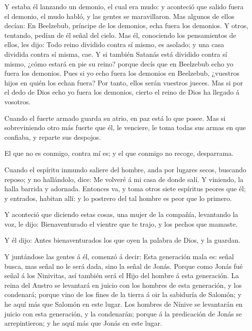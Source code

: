  Y estaba él lanzando un demonio, el cual era mudo: y
aconteció que salido fuera el demonio, el mudo habló, y las gentes se
maravillaron.  Mas algunos de ellos decían: En Beelzebub,
príncipe de los demonios, echa fuera los demonios.  Y
otros, tentando, pedían de él señal del cielo.  Mas él,
conociendo los pensamientos de ellos, les dijo: Todo reino dividido
contra sí mismo, es asolado; y una casa dividida contra sí misma, cae.
 Y si también Satanás está dividido contra sí mismo, ¿cómo
estará en pie su reino? porque decís que en Beelzebub echo yo fuera los
demonios.  Pues si yo echo fuera los demonios en Beelzebub,
¿vuestros hijos en quién los echan fuera? Por tanto, ellos serán
vuestros jueces.  Mas si por el dedo de Dios echo yo fuera
los demonios, cierto el reino de Dios ha llegado á vosotros.

 Cuando el fuerte armado guarda su atrio, en paz está lo
que posee.  Mas si sobreviniendo otro más fuerte que él, le
venciere, le toma todas sus armas en que confiaba, y reparte sus
despojos.

 El que no es conmigo, contra mí es; y el que conmigo no
recoge, desparrama.

 Cuando el espíritu inmundo saliere del hombre, anda por
lugares secos, buscando reposo; y no hallándolo, dice: Me volveré á mi
casa de donde salí.  Y viniendo, la halla barrida y
adornada.  Entonces va, y toma otros siete espíritus peores
que él; y entrados, habitan allí: y lo postrero del tal hombre es peor
que lo primero.

 Y aconteció que diciendo estas cosas, una mujer de la
compañía, levantando la voz, le dijo: Bienaventurado el vientre que te
trajo, y los pechos que mamaste.

 Y él dijo: Antes bienaventurados los que oyen la palabra
de Dios, y la guardan.

 Y juntándose las gentes á él, comenzó á decir: Esta
generación mala es: señal busca, mas señal no le será dada, sino la
señal de Jonás.  Porque como Jonás fué señal á los
Ninivitas, así también será el Hijo del hombre á esta generación.
 La reina del Austro se levantará en juicio con los hombres
de esta generación, y los condenará; porque vino de los fines de la
tierra á oir la sabiduría de Salomón; y he aquí más que Salomón en este
lugar.  Los hombres de Nínive se levantarán en juicio con
esta generación, y la condenarán; porque á la predicación de Jonás se
arrepintieron; y he aquí más que Jonás en este lugar.

